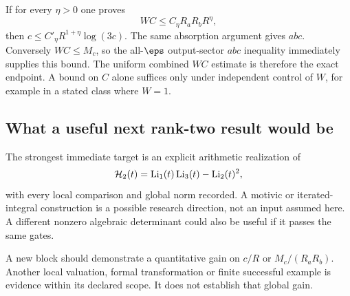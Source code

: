 If for every $\eta>0$ one proves
\[
 WC\le C_\eta R_aR_bR^\eta,
\]
then $c\le C'_{\eta}R^{1+\eta}\log(3c)$. The same absorption argument gives $abc$. Conversely $WC\le M_c$, so the all-$\eps$ output-sector $abc$ inequality immediately supplies this bound. The uniform combined $WC$ estimate is therefore the exact endpoint. A bound on $C$ alone suffices only under independent control of $W$, for example in a stated class where $W=1$.

\subsection{What a useful next rank-two result would be}
The strongest immediate target is an explicit arithmetic realization of
\[
 \mathcal H_2(t)=\operatorname{Li}_1(t)\operatorname{Li}_3(t)-\operatorname{Li}_2(t)^2,
\]
with every local comparison and global norm recorded. A motivic or iterated-integral construction is a possible research direction, not an input assumed here. A different nonzero algebraic determinant could also be useful if it passes the same gates.

A new block should demonstrate a quantitative gain on $c/R$ or $M_c/(R_aR_b)$. Another local valuation, formal transformation or finite successful example is evidence within its declared scope. It does not establish that global gain.
